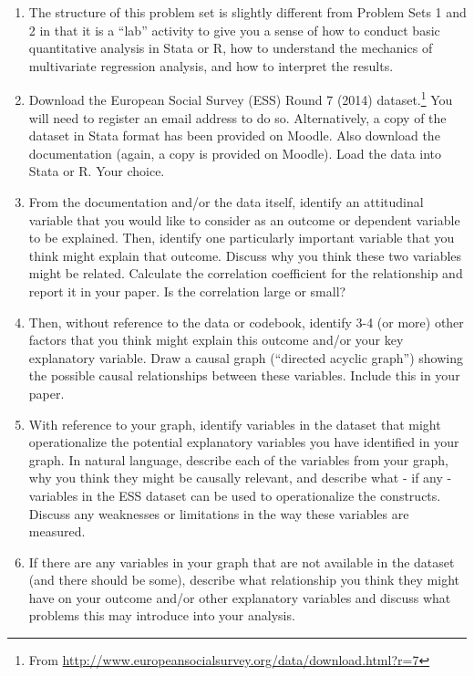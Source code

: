 \documentclass[a4paper]{exam}
\begin{document}
\begin{enumerate}
\item The structure of this problem set is slightly different from Problem Sets 1 and 2 in that it is a ``lab'' activity to give you a sense of how to conduct basic quantitative analysis in Stata or R, how to understand the mechanics of multivariate regression analysis, and how to interpret the results.
 
\item Download the European Social Survey (ESS) Round 7 (2014) dataset.\footnote{From \url{http://www.europeansocialsurvey.org/data/download.html?r=7}} You will need to register an email address to do so. Alternatively, a copy of the dataset in Stata format has been provided on Moodle. Also download the documentation (again, a copy is provided on Moodle). Load the data into Stata or R. Your choice.
 
\item From the documentation and/or the data itself, identify an attitudinal variable that you would like to consider as an outcome or dependent variable to be explained. Then, identify one particularly important variable that you think might explain that outcome. Discuss why you think these two variables might be related. Calculate the correlation coefficient for the relationship and report it in your paper. Is the correlation large or small?

\item Then, without reference to the data or codebook, identify 3-4 (or more) other factors that you think might explain this outcome and/or your key explanatory variable. Draw a causal graph (``directed acyclic graph'') showing the possible causal relationships between these variables. Include this in your paper.
 
\item With reference to your graph, identify variables in the dataset that might operationalize the potential explanatory variables you have identified in your graph. In natural language, describe each of the variables from your graph, why you think they might be causally relevant, and describe what - if any - variables in the ESS dataset can be used to operationalize the constructs. Discuss any weaknesses or limitations in the way these variables are measured.
 
\item If there are any variables in your graph that are not available in the dataset (and there should be some), describe what relationship you think they might have on your outcome and/or other explanatory variables and discuss what problems this may introduce into your analysis.
 

\end{enumerate}
\end{document}
